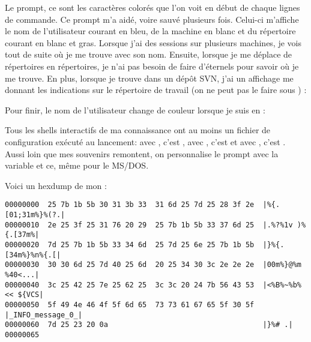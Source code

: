 
Le prompt, ce sont les caractères colorés que l'on voit en début de chaque lignes de commande. Ce prompt m'a aidé, voire sauvé plusieurs fois.  Celui-ci m'affiche le nom de l'utilisateur courant en bleu, de la machine en blanc et du répertoire courant en blanc et gras. Lorsque j'ai des sessions sur plusieurs machines, je vois tout de suite où je me trouve avec son nom. Ensuite, lorsque je me déplace de répertoires en répertoires, je n'ai pas besoin de faire d'éternels  pour savoir où je me trouve. En plus, lorsque je trouve dans un dépôt SVN, j'ai un affichage me donnant les indications sur le répertoire de travail (on ne peut pas le faire sous \cygwin) :


Pour finir, le nom de l'utilisateur change de couleur lorsque je suis en  :


Tous les shells interactifs de ma connaissance ont au moins un fichier de configuration exécuté au lancement: avec \zsh, c'est , avec \bash, c'est  et avec \csh, c'est . Aussi loin que mes souvenirs remontent, on personnalise le prompt avec la variable  et ce, même pour le MS/DOS.

Voici un hexdump de mon   :

\begin{lstlisting}
00000000  25 7b 1b 5b 30 31 3b 33  31 6d 25 7d 25 28 3f 2e  |%{.[01;31m%}%(?.|
00000010  2e 25 3f 25 31 76 20 29  25 7b 1b 5b 33 37 6d 25  |.%?%1v )%{.[37m%|
00000020  7d 25 7b 1b 5b 33 34 6d  25 7d 25 6e 25 7b 1b 5b  |}%{.[34m%}%n%{.[|
00000030  30 30 6d 25 7d 40 25 6d  20 25 34 30 3c 2e 2e 2e  |00m%}@%m %40<...|
00000040  3c 25 42 25 7e 25 62 25  3c 3c 20 24 7b 56 43 53  |<%B%~%b%<< ${VCS|
00000050  5f 49 4e 46 4f 5f 6d 65  73 73 61 67 65 5f 30 5f  |_INFO_message_0_|
00000060  7d 25 23 20 0a                                    |}%# .|
00000065
\end{lstlisting}
